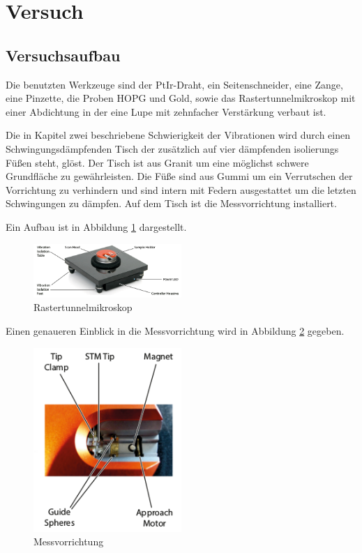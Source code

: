 \section{Versuch}
\subsection{Versuchsaufbau}
Die benutzten Werkzeuge sind der PtIr-Draht, ein Seitenschneider, eine Zange, eine Pinzette, die Proben HOPG und Gold, sowie das Rastertunnelmikroskop mit einer Abdichtung in der eine Lupe mit zehnfacher Verstärkung verbaut ist.

\noindent Die in Kapitel zwei beschriebene Schwierigkeit der Vibrationen wird durch einen Schwingungsdämpfenden Tisch der zusätzlich auf vier dämpfenden isolierungs Füßen steht, glöst. Der Tisch ist aus Granit um eine möglichst schwere Grundfläche zu gewährleisten. Die Füße sind aus Gummi um ein Verrutschen der Vorrichtung zu verhindern und sind intern mit Federn ausgestattet um die letzten Schwingungen zu dämpfen. Auf dem Tisch ist die Messvorrichtung installiert.

\noindent Ein Aufbau ist in Abbildung \ref{fig:Aufbau1} dargestellt. 

\begin{figure}
	\centering
		\includegraphics[width=0.5\textwidth]{Aufbau1.png}
	\caption{Rastertunnelmikroskop}
	\label{fig:Aufbau1}
\end{figure}

\noindent Einen genaueren Einblick in die Messvorrichtung wird in Abbildung \ref{fig:Aufbau2} gegeben.

\begin{figure}
	\centering
		\includegraphics[width=0.5\textwidth]{Aufbau2}
	\caption{Messvorrichtung}
	\label{fig:Aufbau2}
\end{figure}

